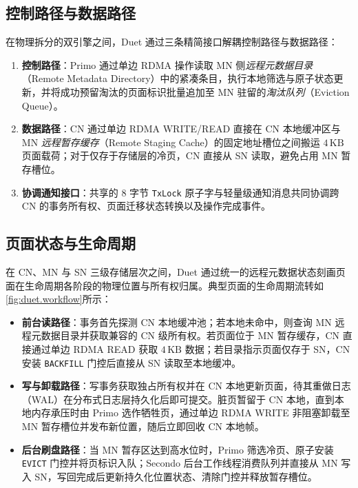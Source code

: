 \subsection{控制路径与数据路径}
在物理拆分的双引擎之间，Duet 通过三条精简接口解耦控制路径与数据路径\cite{yangPolardb2024,liGaussdb2024}：
\begin{enumerate}
    \item \textbf{控制路径}：Primo 通过单边 RDMA 操作读取 MN 侧\emph{远程元数据目录}（Remote Metadata Directory）中的紧凑条目，执行本地筛选与原子状态更新，并将成功预留淘汰的页面标识批量追加至 MN 驻留的\emph{淘汰队列}（Eviction Queue）。
    \item \textbf{数据路径}：CN 通过单边 RDMA WRITE/READ 直接在 CN 本地缓冲区与 MN \emph{远程暂存缓存}（Remote Staging Cache）的固定地址槽位之间搬运 $4\,\text{KB}$ 页面载荷；对于仅存于存储层的冷页，CN 直接从 SN 读取，避免占用 MN 暂存槽位。
    \item \textbf{协调通知接口}：共享的 8 字节 \texttt{TxLock} 原子字与轻量级通知消息共同协调跨 CN 的事务所有权、页面迁移状态转换以及操作完成事件。
\end{enumerate}

\subsection{页面状态与生命周期}
在 CN、MN 与 SN 三级存储层次之间，Duet 通过统一的远程元数据状态刻画页面在生命周期各阶段的物理位置与所有权归属\cite{depoutovitchTaurus2023}。典型页面的生命周期流转如\autoref{fig:duet.workflow}所示：
\begin{itemize}
    \item \textbf{前台读路径}：事务首先探测 CN 本地缓冲池；若本地未命中，则查询 MN 远程元数据目录并获取兼容的 CN 级所有权。若页面位于 MN 暂存缓存，CN 直接通过单边 RDMA READ 获取 $4\,\text{KB}$ 数据；若目录指示页面仅存于 SN，CN 安装 \texttt{BACKFILL} 门控后直接从 SN 读取至本地缓冲。
    \item \textbf{写与卸载路径}：写事务获取独占所有权并在 CN 本地更新页面，待其重做日志（WAL）在分布式日志层持久化后即可提交\cite{grayTransaction1993}。脏页暂留于 CN 本地，直到本地内存承压时由 Primo 选作牺牲页，通过单边 RDMA WRITE 非阻塞卸载至 MN 暂存槽位并发布新位置，随后立即回收 CN 本地帧。
    \item \textbf{后台刷盘路径}：当 MN 暂存区达到高水位时，Primo 筛选冷页、原子安装 \texttt{EVICT} 门控并将页标识入队；Secondo 后台工作线程消费队列并直接从 MN 写入 SN，写回完成后更新持久化位置状态、清除门控并释放暂存槽位。
\end{itemize}

